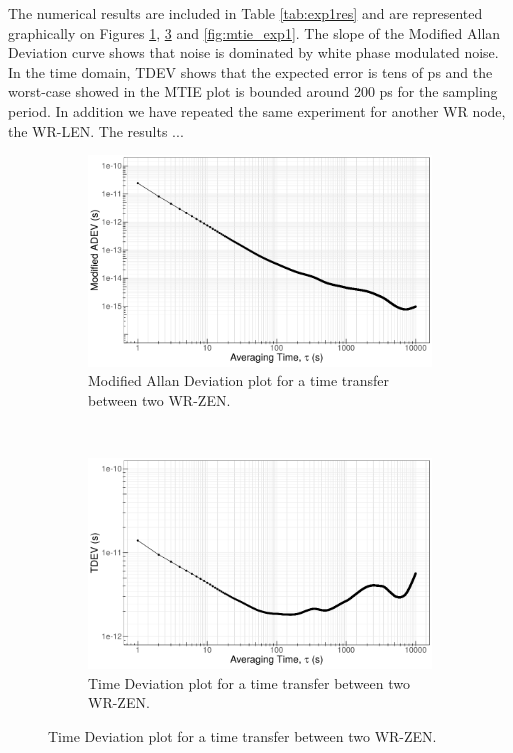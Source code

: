 The numerical results are included in Table \ref{tab:exp1res} and are 
represented graphically on Figures \ref{fig:mdev_exp1}, 
\ref{fig:tdev_exp1} and \ref{fig:mtie_exp1}. The slope of the Modified Allan 
Deviation curve shows that noise is dominated by white phase modulated noise. 
In the time domain, TDEV shows that the expected error is tens of ps and the 
worst-case showed in the MTIE plot is bounded around 200 ps for the sampling 
period. In addition we have repeated the same experiment for another WR node, the WR-LEN.  The results ... 

\begin{figure}
	\centering
	\begin{subfigure}[t]{0.48\textwidth}
		\includegraphics[width=\textwidth]{img/mdev_exp1}
		\caption[MDEV plot for the WR-ZEN]{Modified Allan Deviation plot for a 
		time transfer between two WR-ZEN.}
		\label{fig:mdev_exp1}
	\end{subfigure}
	~ %
	\begin{subfigure}[t]{0.48\textwidth}
		\includegraphics[width=\textwidth]{img/tdev_exp1}
		\caption[TDEV plot for the WR-ZEN]{Time Deviation plot for a time 
		transfer between two WR-ZEN.}
		\label{fig:tdev_exp1}
	\end{subfigure}
\end{figure}

